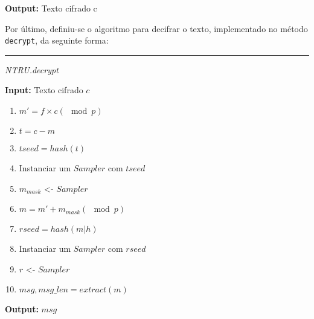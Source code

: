 \documentclass[11pt]{article}
\providecommand{\tightlist}{%
      \setlength{\itemsep}{0pt}\setlength{\parskip}{0pt}}
\begin{document}
\textbf{Output:} Texto cifrado c

Por último, definiu-se o algoritmo para decifrar o texto, implementado
no método \texttt{decrypt}, da seguinte forma:

\begin{center}\rule{0.5\linewidth}{\linethickness}\end{center}

\emph{NTRU.decrypt}

\textbf{Input:} Texto cifrado \(c\)

\begin{enumerate}
\def\labelenumi{\arabic{enumi}.}
\tightlist
\item
  \(m' = f \times c (\mod p)\)
\item
  \(t = c- m\)
\item
  \(tseed = hash(t)\)
\item
  Instanciar um \(Sampler\) com \(tseed\)
\item
  \(m_{mask}\) \textless- \(Sampler\)
\item
  \(m = m' + m_{mask} (\mod p)\)
\item
  \(rseed = hash(m|h)\)
\item
  Instanciar um \(Sampler\) com \(rseed\)
\item
  \(r\) \textless- \(Sampler\)
\item
  \(msg,msg\_len = extract(m)\)
\end{enumerate}

\textbf{Output:} \(msg\)
\end{document}
